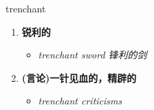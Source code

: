 
\begin{frame}
{\huge trenchant}
\begin{center}
\begin{enumerate}\Large
  \item \textbf{锐利的}
  \begin{itemize}
    \item \em{\Large{trenchant sword 锋利的剑}}
  \end{itemize}
  \item \textbf{(言论)一针见血的，精辟的}
  \begin{itemize}
    \item \em{\Large{trenchant criticisms}}
  \end{itemize}
\end{enumerate}
\end{center}
\end{frame}
